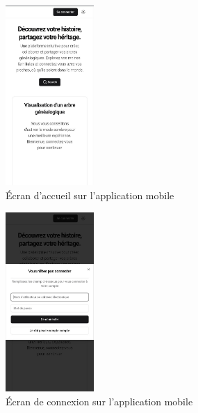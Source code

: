 \begin{figure}[H]
  \centering
  \includegraphics[width=0.3\textwidth]{./capture/homem.png}
  \caption{Écran d'accueil sur l'application mobile}
\end{figure}


\begin{figure}[H]
  \centering
  \includegraphics[width=0.3\textwidth]{capture/loginw.png}
\caption{Écran de connexion sur l'application mobile}
\end{figure}





